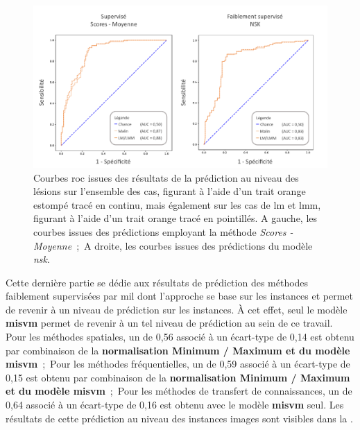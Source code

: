 \begin{figure}[H]
    \centering
    \includegraphics[width=\linewidth]{contents/chapter_7/resources/results_lesion_roc_lesions.pdf}
    \caption{Courbes \gls{roc} issues des résultats de la prédiction au niveau des lésions sur l'ensemble des cas, figurant à l'aide d'un trait orange estompé tracé en continu, mais également sur les cas de \gls{lm} et \gls{lmm}, figurant à l'aide d'un trait orange tracé en pointillés. A gauche, les courbes issues des prédictions employant la méthode \textit{Scores - Moyenne}~;~A droite, les courbes issues des prédictions du modèle \textit{\gls{nsk}}.}
    \label{fig:results_lesion_roc_lesions}
\end{figure}\par

Cette dernière partie se dédie aux résultats de prédiction des méthodes faiblement supervisées par \gls{mil} dont l'approche se base sur les instances et permet de revenir à un niveau de prédiction sur les instances. À cet effet, seul le modèle \textbf{\gls{misvm}} permet de revenir à un tel niveau de prédiction au sein de ce travail. Pour les méthodes spatiales, un \fscore{} de 0,56 associé à un écart-type de 0,14 est obtenu par combinaison de la \textbf{normalisation Minimum / Maximum et du modèle \gls{misvm}}~;~Pour les méthodes fréquentielles, un \fscore{} de 0,59 associé à un écart-type de 0,15 est obtenu par combinaison de la \textbf{normalisation Minimum / Maximum et du modèle \gls{misvm}}~;~Pour les méthodes de transfert de connaissances, un \fscore{} de 0,64 associé à un écart-type de 0,16 est obtenu avec le modèle \textbf{\gls{misvm}} seul. Les résultats de cette prédiction au niveau des instances images sont visibles dans la .\par

